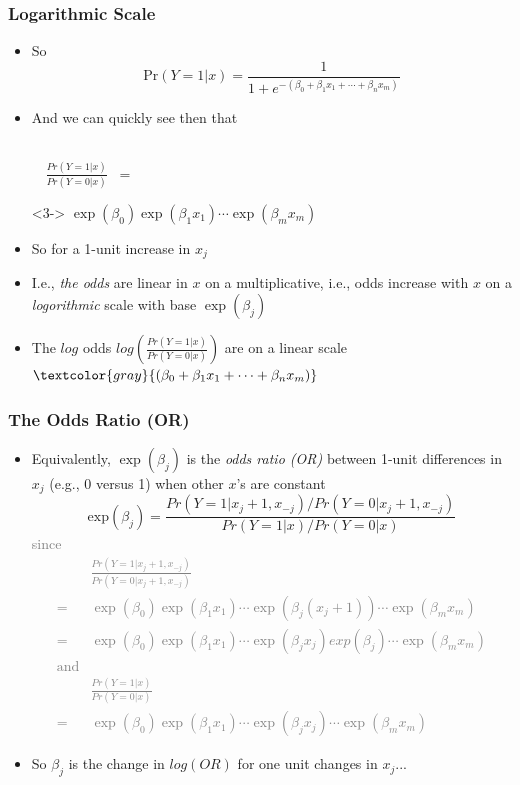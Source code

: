 \documentclass[xcolor={dvipsnames}]{beamer}
\begin{document}
\frame
{
\frametitle{Logarithmic Scale}

\begin{itemize}
\item So
$$\text{Pr}(Y=1|x)  = \frac{1}{1 + e^{-(\beta_0 + \beta_1x_{1} + \cdots + \beta_nx_m )}}$$
\item<2-> And we can quickly see then that \\${}$

$\displaystyle \quad \frac{Pr(Y=1|x)}{Pr(Y=0|x)} \;\; = $
\vspace{-2.1em}
\item[]<3-> \hspace{9.2em}$\displaystyle \exp(\beta_0)\exp(\beta_1x_{1})\cdots\exp(\beta_mx_{m})$
\vspace{2.1em}
\end{itemize}

\begin{itemize}
\setlength\itemsep{1em}
\item<4-> So for a 1-unit increase in $x_{j}$\\
\item<6-> I.e., \emph{the odds} are linear in $x$ on a multiplicative, i.e.,
 odds increase with $x$ on a \emph{logorithmic} scale with base $\exp(\beta_j)$
\item<7-> The $log$ odds $log\left( \frac{Pr(Y=1|x)}{Pr(Y=0|x)} \right)$ are on a linear scale
\hspace*{2in}$\textcolor{gray}{(\beta_0 + \beta_1x_{1} + \cdots + \beta_nx_m)}$
\end{itemize}
}

\frame
{
\frametitle{The Odds Ratio (OR)}

\begin{itemize}
\item Equivalently, $\exp(\beta_j)$ is the \emph{odds ratio (OR)} 
between 1-unit differences in $x_{j}$ (e.g., 0 versus 1) when other $x$'s are constant
$$ \text{exp}(\beta_j) =  \frac{Pr(Y=1|x_j+1,x_{-j})/Pr(Y=0|x_j+1,x_{-j})}{Pr(Y=1|x)/Pr(Y=0|x)}  $$
\textcolor{gray}{
since 
\begin{align*}
{} & \frac{Pr(Y=1|x_j+1,x_{-j})}{Pr(Y=0|x_j+1,x_{-j})} \\
= {} & \exp(\beta_0)\exp(\beta_1x_{1})\cdots\exp(\beta_j(x_{j}+1))\cdots\exp(\beta_mx_{m})\\
= {} & \exp(\beta_0)\exp(\beta_1x_{1})\cdots\exp(\beta_jx_{j})exp(\beta_j)\cdots\exp(\beta_mx_{m})\\
\text{and} {} & \\
{} & \frac{Pr(Y=1|x)}{Pr(Y=0|x)}  \\
= {} & \exp(\beta_0)\exp(\beta_1x_{1})\cdots\exp(\beta_jx_{j})\cdots\exp(\beta_mx_{m}) 
\end{align*}}
\vspace{-.75em}
\item<2-> So $\beta_j$ is the change in $log(OR)$ for one unit changes in $x_j$...
\item[]
\end{itemize}
}
\end{document}
